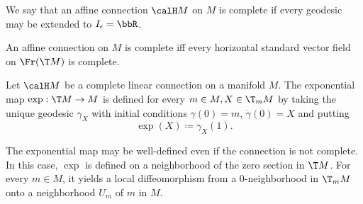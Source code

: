 We say that an affine connection $\calH M$ on $M$ is complete if every geodesic may be extended to $I_\epsilon=\bbR$.

\begin{cor}[{{\cite[Cor.~2.1.24]{RS2}}}]\label{cor 2.1.24 RS2}
    An affine connection on $M$ is complete iff every horizontal standard vector field on $\Fr(\T M)$ is complete.
\end{cor}


\begin{defn}
    Let $\calH M$ be a complete linear connection on a manifold $M$. The exponential map $\exp: \T M\to M$ is defined for every $m\in M, X\in \T_mM$ by taking the unique geodesic $\gamma_X$ with initial conditions $\gamma(0)=m$, $\dot\gamma(0)=X$ and putting 
    \[\exp(X)\coloneqq \gamma_X(1).\]
\end{defn}

\begin{rem}
    The exponential map may be well-defined even if the connection is not complete. In this case, $\exp$ is defined on a neighborhood of the zero section in $\T M$. For every $m\in M$, it yields a local diffeomorphism from a $0$-neighborhood in $\T_m M$ onto a neighborhood $U_m$ of $m$ in $M$.
\end{rem}



